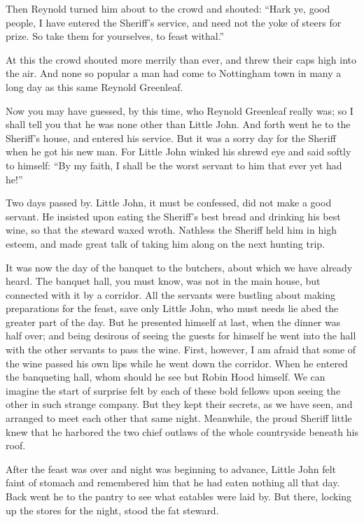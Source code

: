 Then Reynold turned him about to the crowd and shouted: ``Hark ye, good
people, I have entered the Sheriff's service, and need not the yoke of
steers for prize. So take them for yourselves, to feast withal.''

At this the crowd shouted more merrily than ever, and threw their caps
high into the air. And none so popular a man had come to Nottingham town
in many a long day as this same Reynold Greenleaf.

Now you may have guessed, by this time, who Reynold Greenleaf really
was; so I shall tell you that he was none other than Little John. And
forth went he to the Sheriff's house, and entered his service. But it
was a sorry day for the Sheriff when he got his new man. For Little John
winked his shrewd eye and said softly to himself: ``By my faith, I shall
be the worst servant to him that ever yet had he!''

Two days passed by. Little John, it must be confessed, did not make a
good servant. He insisted upon eating the Sheriff's best bread and
drinking his best wine, so that the steward waxed wroth. Nathless the
Sheriff held him in high esteem, and made great talk of taking him along
on the next hunting trip.

It was now the day of the banquet to the butchers, about which we have
already heard. The banquet hall, you must know, was not in the main
house, but connected with it by a corridor. All the servants were
bustling about making preparations for the feast, save only Little John,
who must needs lie abed the greater part of the day. But he presented
himself at last, when the dinner was half over; and being desirous of
seeing the guests for himself he went into the hall with the other
servants to pass the wine. First, however, I am afraid that some of the
wine passed his own lips while he went down the corridor. When he
entered the banqueting hall, whom should he see but Robin Hood himself.
We can imagine the start of surprise felt by each of these bold fellows
upon seeing the other in such strange company. But they kept their
secrets, as we have seen, and arranged to meet each other that same
night. Meanwhile, the proud Sheriff little knew that he harbored the two
chief outlaws of the whole countryside beneath his roof.

After the feast was over and night was beginning to advance, Little John
felt faint of stomach and remembered him that he had eaten nothing all
that day. Back went he to the pantry to see what eatables were laid by.
But there, locking up the stores for the night, stood the fat steward.

